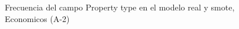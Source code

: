 \begin{figure}[H]
    \centering
    
    \caption{Frecuencia del campo Property type en el modelo real y smote, Economicos (A-2)}
    \label{frecuency-Property Type-smote-enc}
\end{figure}